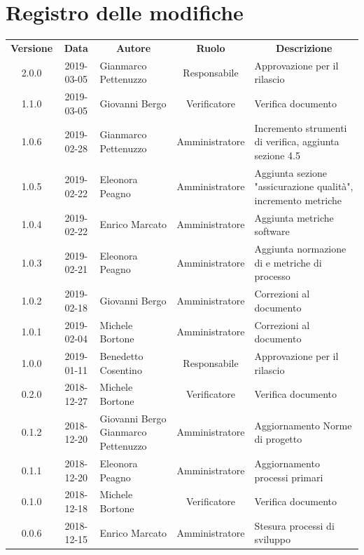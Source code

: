 \documentclass[11pt,a4paper]{article}
\begin{document}
	
	
	{\def\arraystretch{2}\tabcolsep=10pt
	\newpage
	\section*{\centering Registro delle modifiche}
	\begin{tabularx}{\textwidth}{ c | c | p{3.80cm} | c | X }
		\rowcolor{LightBlue}
		\color{white}\bfseries Versione & \color{white}\bfseries Data & \multicolumn{1}{c}{\color{white}\bfseries Autore}
		& \color{white}\bfseries Ruolo & \multicolumn{1}{c}{\color{white}\bfseries Descrizione}\\[0.25cm]
		2.0.0 & 2019-03-05 & Gianmarco Pettenuzzo & Responsabile & Approvazione per il rilascio \\ \hline
		1.1.0 & 2019-03-05 & Giovanni Bergo & Verificatore & Verifica documento \\ \hline
		1.0.6 & 2019-02-28 & Gianmarco Pettenuzzo & Amministratore & Incremento strumenti di verifica, aggiunta sezione 4.5 \\ \hline
		1.0.5 & 2019-02-22 & Eleonora Peagno & Amministratore & Aggiunta sezione "assicurazione qualità", incremento metriche \\ \hline
		1.0.4 & 2019-02-22 & Enrico Marcato & Amministratore & Aggiunta metriche software \\ \hline
		1.0.3 & 2019-02-21 & Eleonora Peagno & Amministratore & Aggiunta normazione di e metriche di processo \\ \hline
		1.0.2 & 2019-02-18 & Giovanni Bergo & Amministratore & Correzioni al documento \\ \hline
		1.0.1 & 2019-02-04 & Michele Bortone & Amministratore & Correzioni al documento \\ \hline
		1.0.0 & 2019-01-11 & Benedetto Cosentino & Responsabile & Approvazione per il rilascio \\ \hline
		0.2.0 & 2018-12-27 & Michele Bortone & Verificatore & Verifica documento \\ \hline
		0.1.2 & 2018-12-20 & Giovanni Bergo \newline Gianmarco Pettenuzzo & Amministratore & Aggiornamento Norme di progetto \\ \hline
		0.1.1 & 2018-12-20 & Eleonora Peagno & Amministratore & Aggiornamento processi primari \\ \hline
		0.1.0 & 2018-12-18 & Michele Bortone & Verificatore & Verifica documento \\ \hline
		0.0.6 & 2018-12-15 & Enrico Marcato & Amministratore & Stesura processi di \newline sviluppo \\ \hline

\end{tabularx}}
\end{document}
